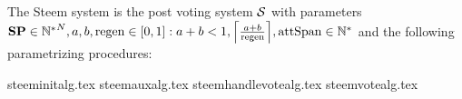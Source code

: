 \begin{definition}
  The Steem system is the post voting system $\mathcal{S}$ with parameters $\stpowvec
  \in {\mathbb{N}^*}^N, a, b, \regen \in \left[0, 1\right]: a + b < 1,
  \ceil*{\frac{a + b}{\regen}}, \attspan \in \mathbb{N}^*$ and the following
  parametrizing procedures:
\end{definition}
{steeminitalg.tex}
{steemauxalg.tex}
{steemhandlevotealg.tex}
{steemvotealg.tex}
